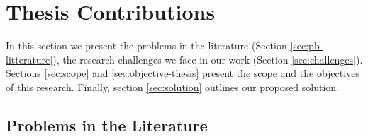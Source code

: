 \section{Thesis Contributions}


In this section we present the problems in the literature (Section \ref{sec:pb-litterature}), the research challenges we face in our work (Section \ref{sec:challenges}). Sections \ref{sec:scope} and \ref{sec:objective-thesis} present the scope and the objectives of this research. Finally, section \ref{sec:solution} outlines our proposed solution.

\subsection{Problems in the Literature\label{sec:pb-litterature}}

